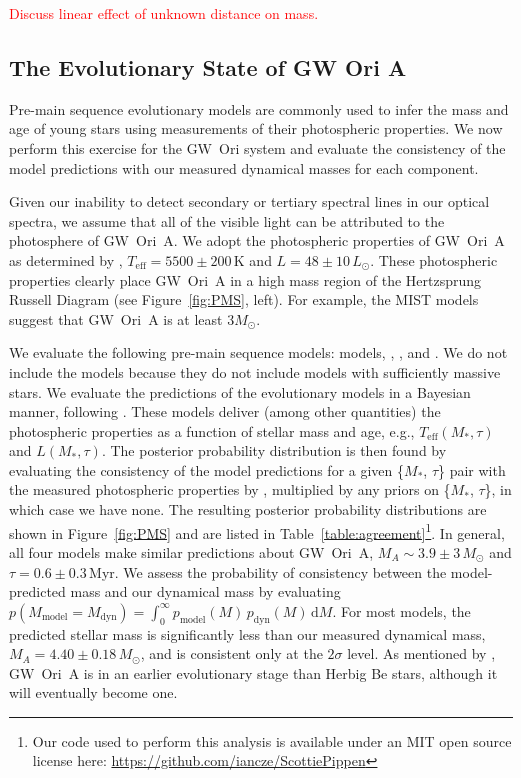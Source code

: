 \documentclass[twocolumn]{aastex61}
\newcommand{\todo}[1]{ \textcolor{red}{#1}}
\begin{document}
\todo{Discuss linear effect of unknown distance on mass.}

\subsection{The Evolutionary State of GW Ori A}
Pre-main sequence evolutionary models are commonly used to infer the mass and age of young stars using measurements of their photospheric properties. We now perform this exercise for the GW~Ori system and evaluate the consistency of the model predictions with our measured dynamical masses for each component.

Given our inability to detect secondary or tertiary spectral lines in our optical spectra, we assume that all of the visible light can be attributed to the photosphere of GW~Ori~A. We adopt the photospheric properties of GW~Ori~A as determined by \citet{fang14}, $T_\mathrm{eff} = 5500 \pm 200\,\mathrm{K}$ and $L = 48 \pm 10\,L_\odot$. These photospheric properties clearly place GW~Ori~A in a high mass region of the Hertzsprung Russell Diagram (see Figure~\ref{fig:PMS}, left). For example, the MIST models suggest that GW~Ori~A is at least $3 M_\odot$.

We evaluate the following pre-main sequence models: \citet{choi16} models, \citet{dotter08}, \citet{tognelli11}, and \citet{siess00}. We do not include the \citet{baraffe15} models because they do not include models with sufficiently massive stars. We evaluate the predictions of the evolutionary models in a Bayesian manner, following \citet{jorgensen05}. These models deliver (among other quantities) the photospheric properties as a function of stellar mass and age,
e.g., $T_\mathrm{eff}(M_\ast, \tau)$ and $L(M_\ast, \tau)$. The posterior probability distribution is then found by evaluating the consistency of the model predictions for a given \{$M_\ast$, $\tau$\} pair with the measured photospheric properties by \citet{fang14}, multiplied by any priors on  \{$M_\ast$, $\tau$\}, in which case we have none. The resulting posterior probability distributions are shown in Figure~\ref{fig:PMS} and are listed in Table~\ref{table:agreement}\footnote{Our code used to perform this analysis is available under an MIT open source license here: \url{https://github.com/iancze/ScottiePippen}}. In general, all four models make similar predictions about GW~Ori~A, $M_A \sim 3.9 \pm 3\,M_\odot$ and $\tau = 0.6 \pm 0.3\,$Myr. We assess the probability of consistency between the model-predicted mass and our dynamical mass by evaluating $p(M_\mathrm{model} = M_\mathrm{dyn}) = \int_0^\infty p_\mathrm{model}(M) \, p_\mathrm{dyn}(M) \, \mathrm{d}M$. For most models, the predicted stellar mass is significantly less than our measured dynamical mass, $M_A = 4.40 \pm 0.18\,M_\odot$, and is consistent only at the $2\sigma$ level. As mentioned by \citet{fang14}, GW~Ori~A is in an earlier evolutionary stage than Herbig Be stars, although it will eventually become one.
\end{document}
